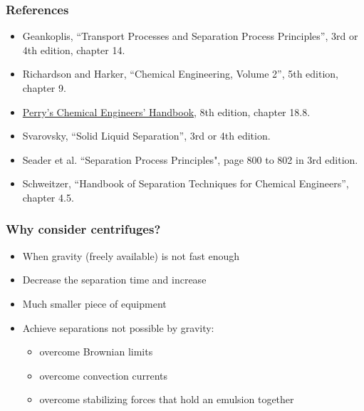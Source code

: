 \begin{frame}\frametitle{References}
	\begin{itemize}
		\item	Geankoplis, ``Transport Processes and Separation Process Principles'', 3rd or 4th edition, chapter 14.
		\item	Richardson and Harker, ``Chemical Engineering, Volume 2'', 5th edition, chapter 9.
		\item	\href{http://accessengineeringlibrary.com/browse/perrys-chemical-engineers-handbook-eighth-edition}{Perry's Chemical Engineers' Handbook}, 8th edition, chapter 18.8.
		\item	Svarovsky, ``Solid Liquid Separation'', 3rd or 4th edition. %
		\item	Seader et al. ``Separation Process Principles", page 800 to 802 in 3rd edition.
		\item	Schweitzer, ``Handbook of Separation Techniques for Chemical Engineers'', chapter 4.5.
	\end{itemize}
\end{frame}

\begin{frame}\frametitle{Why consider centrifuges?}
	\begin{itemize}
		\item	When gravity (freely available) is not fast enough
		\item	Decrease the separation time and increase {}
		\item	Much smaller piece of equipment
		\item	Achieve separations not possible by gravity:
			\begin{itemize}
				\item	overcome Brownian limits
				\item	overcome convection currents
				\item	overcome stabilizing forces that hold an emulsion together
			\end{itemize}
	\end{itemize}
	\vspace{12pt}
	\begin{exampleblock}{}
		{\color{myGreen}{Why not just apply flocculation?}}
	\end{exampleblock}
\end{frame}

